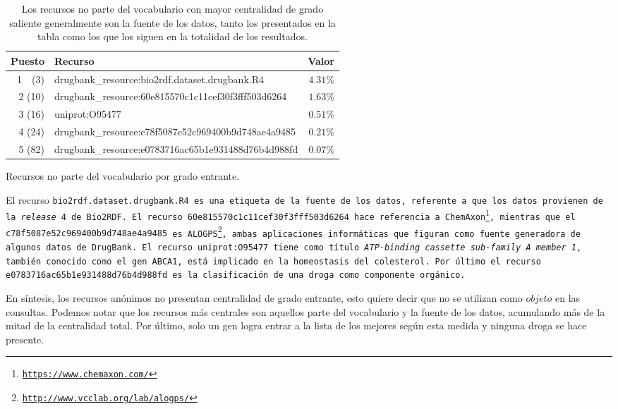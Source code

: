 \begin{table}[h!]
  \centering
  \begin{tabular}{|r|l|r|}\hline
    \bf{Puesto} & \bf{Recurso} & \bf{Valor} \\\hline
    1~~(3) & drugbank\_resource:bio2rdf.dataset.drugbank.R4			 & $4.31\%$ \\\hline
    2 (10) & drugbank\_resource:60e815570c1c11cef30f3fff503d6264 & $1.63\%$ \\\hline
    3 (16) & uniprot:O95477                                      & $0.51\%$ \\\hline
    4 (24) & drugbank\_resource:c78f5087e52c969400b9d748ae4a9485 & $0.21\%$ \\\hline
    5 (82) & drugbank\_resource:e0783716ac65b1e931488d76b4d988fd & $0.07\%$ \\\hline
  \end{tabular}
  \caption{Recursos no parte del vocabulario por grado entrante.}
  \label{tab:idct5}
  \vspace{-.2cm}
  \caption*{\small
    Los recursos no parte del vocabulario con mayor centralidad de grado
    saliente generalmente son la fuente de los datos, tanto los presentados en
    la tabla como los que los siguen en la totalidad de los resultados.
  }
\end{table}

El recurso \tt{bio2rdf.dataset.drugbank.R4} es una etiqueta de la fuente de los
datos, referente a que los datos provienen de la \emph{release} 4 de Bio2RDF.
El recurso \tt{60e815570c1c11cef30f3fff503d6264} hace referencia a 
ChemAxon\footnote{\url{https://www.chemaxon.com/}},
mientras que el \tt{c78f5087e52c969400b9d748ae4a9485} es 
ALOGPS\footnote{\url{http://www.vcclab.org/lab/alogps/}}, ambas aplicaciones
informáticas que figuran como fuente generadora de algunos datos de DrugBank.
El recurso \tt{uniprot:O95477} tiene como título \emph{ATP-binding cassette
sub-family A member 1}, también conocido como el gen ABCA1, está implicado en
la homeostasis del colesterol.
Por último el recurso 
\tt{e0783716ac65b1e931488d76b4d988fd} es la clasificación de una droga como
componente orgánico.

En síntesis, los recursos anónimos no presentan centralidad de grado entrante,
esto quiere decir que no se utilizan como $objeto$ en las consultas.
Podemos notar que los recursos más centrales son aquellos parte del
vocabulario y la fuente de los datos, acumulando más de la mitad de la
centralidad total.
Por último, solo un gen logra entrar a la lista de los mejores según esta medida
y ninguna droga se hace presente. 

